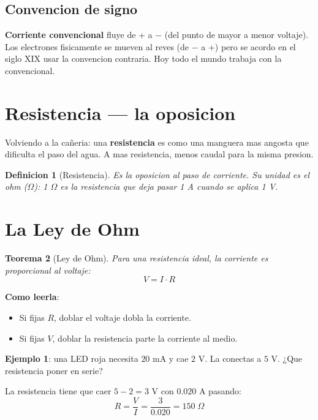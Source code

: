 \documentclass[11pt,a4paper,oneside,openright]{book}
\newtheorem{definicion}{Definicion}[chapter]
\newtheorem{teorema}[definicion]{Teorema}
\begin{document}
\subsection{Convencion de signo}

\textbf{Corriente convencional} fluye de + a $-$ (del punto de mayor a
menor voltaje). Los electrones fisicamente se mueven al reves (de $-$ a
+) pero se acordo en el siglo XIX usar la convencion contraria. Hoy todo
el mundo trabaja con la convencional.

\section{Resistencia --- la oposicion}

\begin{intuibox}
Volviendo a la cañeria: una \textbf{resistencia} es como una manguera
mas angosta que dificulta el paso del agua. A mas resistencia, menos caudal
para la misma presion.
\end{intuibox}

\begin{definicion}[Resistencia]
Es la oposicion al paso de corriente. Su unidad es el ohm ($\Omega$):
1 $\Omega$ es la resistencia que deja pasar 1 A cuando se aplica 1 V.
\end{definicion}

\section{La Ley de Ohm}

\begin{teorema}[Ley de Ohm]
Para una resistencia ideal, la corriente es proporcional al voltaje:
\begin{equation}
\boxed{V = I \cdot R}
\label{eq:ohm}
\end{equation}
\end{teorema}

\textbf{Como leerla}:
\begin{itemize}[leftmargin=2em]
  \item Si fijas $R$, doblar el voltaje dobla la corriente.
  \item Si fijas $V$, doblar la resistencia parte la corriente al medio.
\end{itemize}

\begin{calculo}
\textbf{Ejemplo 1}: una LED roja necesita $20$ mA y cae $2$ V. La conectas
a $5$ V. ¿Que resistencia poner en serie?

La resistencia tiene que caer $5 - 2 = 3$ V con $0.020$ A pasando:
\[
R = \frac{V}{I} = \frac{3}{0.020} = 150\;\Omega
\]
\end{calculo}
\end{document}
